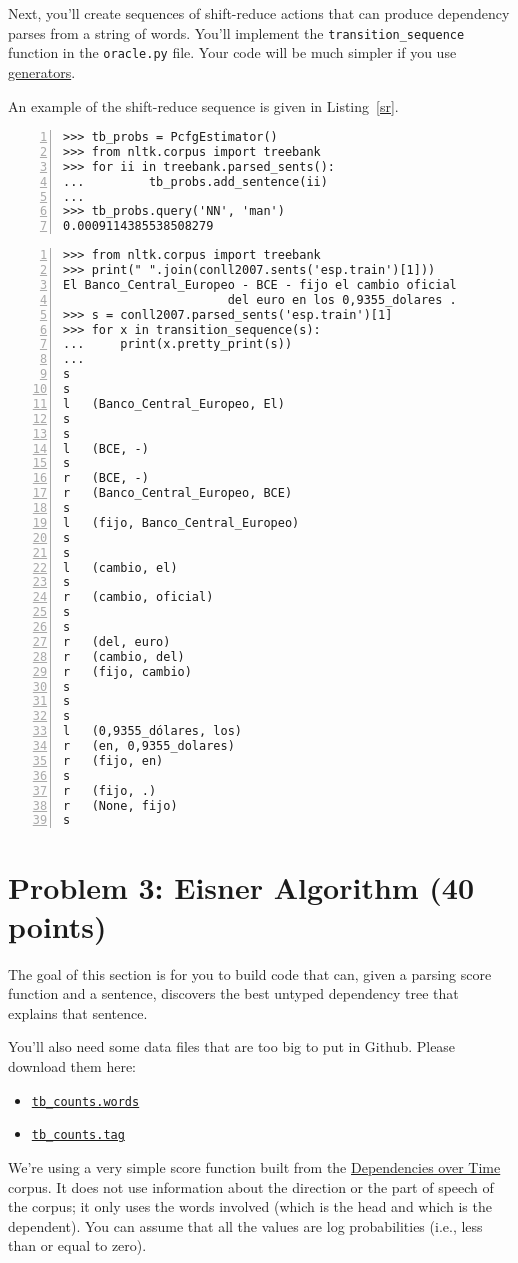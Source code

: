 \documentclass[11pt]{article}
\begin{document}
Next, you'll create sequences of shift-reduce actions that can produce
dependency parses from a string of words.  You'll implement the
\texttt{transition\_sequence} function in the \texttt{oracle.py} file.
Your code will be much simpler if you use
\href{https://wiki.python.org/moin/Generators}{generators}.

An example of the shift-reduce sequence is given in Listing~\ref{sr}.

\begin{lstlisting}[float, label=pcfg,caption=Estimating production probabilities from Treebank data, frame=trBL,escapechar=*, numbers=left, numberstyle=\tiny, numberblanklines=false]
>>> tb_probs = PcfgEstimator()
>>> from nltk.corpus import treebank
>>> for ii in treebank.parsed_sents():
...         tb_probs.add_sentence(ii)
...
>>> tb_probs.query('NN', 'man')
0.0009114385538508279
\end{lstlisting}

\begin{lstlisting}[float, label=sr,caption=Creating a shift-reduce
sequence from a dependency parse, frame=trBL,escapechar=*,
numbers=left, numberstyle=\tiny, numberblanklines=false]
>>> from nltk.corpus import treebank
>>> print(" ".join(conll2007.sents('esp.train')[1]))
El Banco_Central_Europeo - BCE - fijo el cambio oficial
                       del euro en los 0,9355_dolares .
>>> s = conll2007.parsed_sents('esp.train')[1]
>>> for x in transition_sequence(s):
...     print(x.pretty_print(s))
...
s
s
l	(Banco_Central_Europeo, El)
s
s
l	(BCE, -)
s
r	(BCE, -)
r	(Banco_Central_Europeo, BCE)
s
l	(fijo, Banco_Central_Europeo)
s
s
l	(cambio, el)
s
r	(cambio, oficial)
s
s
r	(del, euro)
r	(cambio, del)
r	(fijo, cambio)
s
s
s
l	(0,9355_dólares, los)
r	(en, 0,9355_dolares)
r	(fijo, en)
s
r	(fijo, .)
r	(None, fijo)
s
\end{lstlisting}

\section*{Problem 3: Eisner Algorithm (40 points)}

The goal of this section is for you to build code that can, given a
parsing score function and a sentence, discovers the best untyped
dependency tree that explains that sentence.

You’ll also need some data files that are too big to put in Github.
Please download them here:
\begin{itemize}
\item \href{http://terpconnect.umd.edu/~ying/cl1/tb_counts.words}{\texttt{tb\_counts.words}}
\item
  \href{http://terpconnect.umd.edu/~ying/cl1/tb_counts.tag}{\texttt{tb\_counts.tag}}
\end{itemize}
We’re using a very simple score function built from the
\href{http://googleresearch.blogspot.com/2013/05/syntactic-ngrams-over-time.html}{Dependencies
  over Time} corpus. It does not use information about the direction
or the part of speech of the corpus; it only uses the words involved
(which is the head and which is the dependent).  You can assume that
all the values are log probabilities (i.e., less than or equal to
zero).
\end{document}
